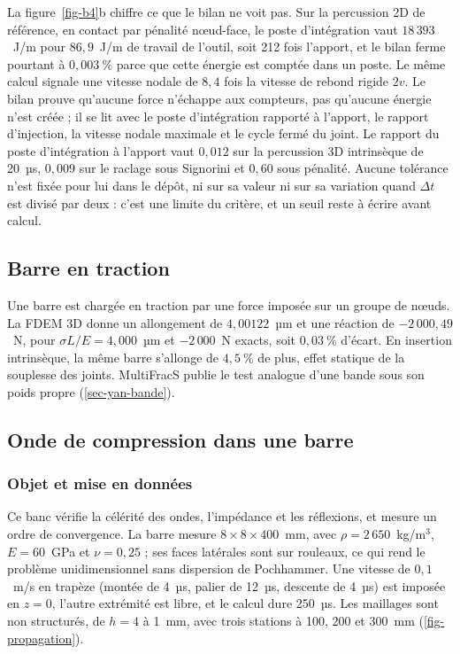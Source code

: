 La figure~\ref{fig-b4}b chiffre ce que le bilan ne voit pas. Sur la percussion 2D de référence, en contact par pénalité nœud-face, le poste d'intégration vaut $18\,393$~J/m pour $86{,}9$~J/m de travail de l'outil, soit 212 fois l'apport, et le bilan ferme pourtant à $0{,}003~\%$ parce que cette énergie est comptée dans un poste. Le même calcul signale une vitesse nodale de $8{,}4$ fois la vitesse de rebond rigide $2v$. Le bilan prouve qu'aucune force n'échappe aux compteurs, pas qu'aucune énergie n'est créée ; il se lit avec le poste d'intégration rapporté à l'apport, le rapport d'injection, la vitesse nodale maximale et le cycle fermé du joint. Le rapport du poste d'intégration à l'apport vaut $0{,}012$ sur la percussion 3D intrinsèque de 20~µs, $0{,}009$ sur le raclage sous Signorini et $0{,}60$ sous pénalité. Aucune tolérance n'est fixée pour lui dans le dépôt, ni sur sa valeur ni sur sa variation quand $\Delta t$ est divisé par deux : c'est une limite du critère, et un seuil reste à écrire avant calcul.

\subsection{Barre en traction}

Une barre est chargée en traction par une force imposée sur un groupe de nœuds. La FDEM 3D donne un allongement de $4{,}00122$~µm et une réaction de $-2\,000{,}49$~N, pour $\sigma L/E = 4{,}000$~µm et $-2\,000$~N exacts, soit $0{,}03~\%$ d'écart. En insertion intrinsèque, la même barre s'allonge de $4{,}5~\%$ de plus, effet statique de la souplesse des joints. MultiFracS publie le test analogue d'une bande sous son poids propre (\cref{sec-yan-bande}).

\subsection{Onde de compression dans une barre}
\label{sec-V1}

\subsubsection{Objet et mise en données}

Ce banc vérifie la célérité des ondes, l'impédance et les réflexions, et mesure un ordre de convergence. La barre mesure $8 \times 8 \times 400$~mm, avec $\rho = 2\,650$~kg/m$^3$, $E = 60$~GPa et $\nu = 0{,}25$ ; ses faces latérales sont sur rouleaux, ce qui rend le problème unidimensionnel sans dispersion de Pochhammer. Une vitesse de $0{,}1$~m/s en trapèze (montée de 4~µs, palier de 12~µs, descente de 4~µs) est imposée en $z = 0$, l'autre extrémité est libre, et le calcul dure 250~µs. Les maillages sont non structurés, de $h = 4$ à 1~mm, avec trois stations à 100, 200 et 300~mm (\cref{fig-propagation}).

